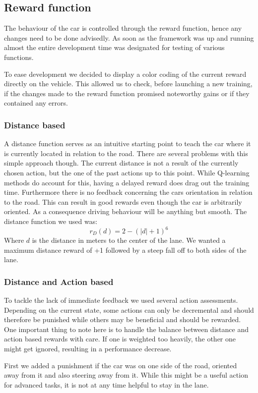 \subsection{Reward function}
The behaviour of the car is controlled through the reward function, hence any changes need to be done advisedly. As soon as the framework was up and running almost the entire development time was designated for testing of various functions. 

To ease development we decided to display a color coding of the current reward directly on the vehicle. This allowed us to check, before launching a new training, if the changes made to the reward function promised noteworthy gains or if they contained any errors. 
\subsubsection{Distance based}
A distance function serves as an intuitive starting point to teach the car where it is currently located in relation to the road. There are several problems with this simple approach though. The current distance is not a result of the currently chosen action, but the one of the past actions up to this point. While Q-learning methods do account for this, having a delayed reward does drag out the training time. Furthermore there is no feedback concerning the cars orientation in relation to the road. This can result in good rewards even though the car is arbitrarily oriented. As a consequence driving behaviour will be anything but smooth. The distance function we used was:
\[ r_D(d) = 2 - (|d| + 1)^6 \]
Where $d$ is the distance in meters to the center of the lane. We wanted a maximum distance reward of +1 followed by a steep fall off to both sides of the lane.
\subsubsection{Distance and Action based}
To tackle the lack of immediate feedback we used several action assessments. Depending on the current state, some actions can only be decremental and should therefore be punished while others may be beneficial and should be rewarded. One important thing to note here is to handle the balance between distance and action based rewards with care. If one is weighted too heavily, the other one might get ignored, resulting in a performance decrease.

First we added a punishment if the car was on one side of the road, oriented away from it and also steering away from it. While this might be a useful action for advanced tasks, it is not at any time helpful to stay in the lane.

